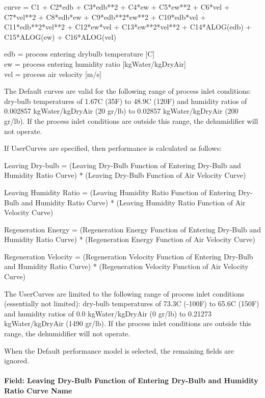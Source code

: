 curve = C1 + C2*edb + C3*edb**2 + C4*ew + C5*ew**2 + C6*vel + C7*vel**2 + C8*edb*ew + C9*edb**2*ew**2 + C10*edb*vel + C11*edb**2*vel**2 + C12*ew*vel + C13*ew**2*vel**2 + C14*ALOG(edb) + C15*ALOG(ew) + C16*ALOG(vel)

edb = process entering drybulb temperature {[}C{]}\\
ew = process entering humidity ratio {[}kgWater/kgDryAir{]}\\
vel = process air velocity {[}m/s{]}

The Default curves are valid for the following range of process inlet conditions: dry-bulb temperatures of 1.67C (35F) to 48.9C (120F) and humidity ratios of 0.002857 kgWater/kgDryAir (20 gr/lb) to 0.02857 kgWater/kgDryAir (200 gr/lb). If the process inlet conditions are outside this range, the dehumidifier will not operate.

If UserCurves are specified, then performance is calculated as follows:

Leaving Dry-bulb = (Leaving Dry-Bulb Function of Entering Dry-Bulb and Humidity Ratio Curve) * (Leaving Dry-Bulb Function of Air Velocity Curve)

Leaving Humidity Ratio = (Leaving Humidity Ratio Function of Entering Dry-Bulb and Humidity Ratio Curve) * (Leaving Humidity Ratio Function of Air Velocity Curve)

Regeneration Energy = (Regeneration Energy Function of Entering Dry-Bulb and Humidity Ratio Curve) * (Regeneration Energy Function of Air Velocity Curve)

Regeneration Velocity = (Regeneration Velocity Function of Entering Dry-Bulb and Humidity Ratio Curve) * (Regeneration Velocity Function of Air Velocity Curve)

The UserCurves are limited to the following range of process inlet conditions (essentially not limited): dry-bulb temperatures of 73.3C (-100F) to 65.6C (150F) and humidity ratios of 0.0 kgWater/kgDryAir (0 gr/lb) to 0.21273 kgWater/kgDryAir (1490 gr/lb). If the process inlet conditions are outside this range, the dehumidifier will not operate.

When the Default performance model is selected, the remaining fields are ignored.

\paragraph{Field: Leaving Dry-Bulb Function of Entering Dry-Bulb and Humidity Ratio Curve Name}\label{field-leaving-dry-bulb-function-of-entering-dry-bulb-and-humidity-ratio-curve-name}

